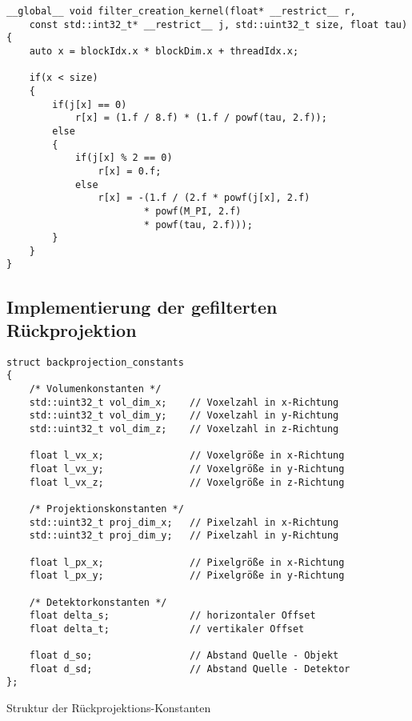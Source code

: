 \begin{code}
\begin{verbatim}
__global__ void filter_creation_kernel(float* __restrict__ r,
    const std::int32_t* __restrict__ j, std::uint32_t size, float tau)
{
    auto x = blockIdx.x * blockDim.x + threadIdx.x;

    if(x < size)
    {
        if(j[x] == 0)
            r[x] = (1.f / 8.f) * (1.f / powf(tau, 2.f));
        else
        {
            if(j[x] % 2 == 0)
                r[x] = 0.f;
            else
                r[x] = -(1.f / (2.f * powf(j[x], 2.f)
                        * powf(M_PI, 2.f)
                        * powf(tau, 2.f)));
        }
    }
}
\end{verbatim}
\label{app:filter_gen}
\end{code}

\begin{code}
\label{app:filter_norm}
\end{code}

\subsection{Implementierung der gefilterten Rückprojektion}

\begin{code}
\begin{verbatim}
struct backprojection_constants
{
    /* Volumenkonstanten */
    std::uint32_t vol_dim_x;    // Voxelzahl in x-Richtung
    std::uint32_t vol_dim_y;    // Voxelzahl in y-Richtung
    std::uint32_t vol_dim_z;    // Voxelzahl in z-Richtung

    float l_vx_x;               // Voxelgröße in x-Richtung
    float l_vx_y;               // Voxelgröße in y-Richtung
    float l_vx_z;               // Voxelgröße in z-Richtung

    /* Projektionskonstanten */
    std::uint32_t proj_dim_x;   // Pixelzahl in x-Richtung
    std::uint32_t proj_dim_y;   // Pixelzahl in y-Richtung

    float l_px_x;               // Pixelgröße in x-Richtung
    float l_px_y;               // Pixelgröße in y-Richtung

    /* Detektorkonstanten */
    float delta_s;              // horizontaler Offset
    float delta_t;              // vertikaler Offset

    float d_so;                 // Abstand Quelle - Objekt
    float d_sd;                 // Abstand Quelle - Detektor
};
\end{verbatim}
\caption{Struktur der Rückprojektions-Konstanten}
\label{app:fdk_consts}
\end{code}

